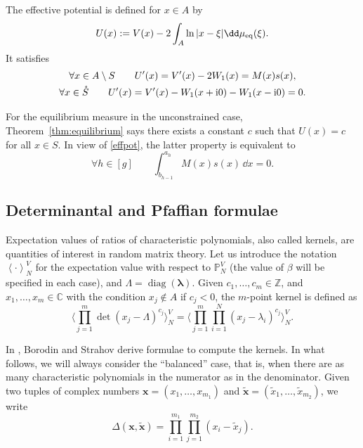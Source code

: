 \documentclass[pdftex]{sigma}
\numberwithin{equation}{section}
\newcommand{\mean}[1]{\left\langle{#1}\right\rangle}
\begin{document}
\begin{Definition}
The effective potential is defined for $x \in A$ by
\[
U(x) := V(x) - 2 \int_{A} \ln|x - \xi|\dd \mu_{{\rm eq}}(\xi).
\]
 It satisfies
\begin{gather}
\forall x \in A \setminus S  \qquad U'(x) = V'(x) - 2W_1(x) = M(x)s(x), \nonumber\\
\forall x \in \mathring{S}  \qquad U'(x) = V'(x) - W_1(x + {\rm i}0) - W_1(x - {\rm i}0) = 0.\label{effpot}
\end{gather}
\end{Definition}
\begin{Remark}%
\label{Rem:vanishint} For the equilibrium measure in the unconstrained case, Theorem~\ref{thm:equilibrium} says there exists a constant $c$ such that $U(x) = c$ for all $x \in S$. In view of \eqref{effpot}, the latter property is equivalent to
\begin{equation*}
\forall h \in [g]\qquad \int_{b_{h - 1}}^{a_h} M(x)s(x)\,\dd x = 0.
\end{equation*}
\end{Remark}

\subsection{Determinantal and Pfaffian
 formulae}%

Expectation values of ratios of
characteristic polynomials, also called kernels, are quantities of interest in random matrix theory. Let us introduce the notation
 $\mean{\cdot}^{V}_{N}$ for the expectation value with respect to $\mathbb{P}_{N}^V$ (the value of $\beta$ will be specified in each case), and $\Lambda = \operatorname{diag}(\bm{\lambda})$. Given $c_1,\ldots,c_m \in \mathbb{Z}$, and $x_1,\ldots,x_m \in \mathbb{C}$ with the condition $x_j \notin A$ if $c_j < 0$, the $m$-point kernel is defined as
\[
 \Biggl\langle \prod_{j=1}^{m} \det (x_{j} - \Lambda)^{c_j}\Biggr\rangle_{N}^{V} = \Biggl\langle \prod_{j=1}^{m} \prod_{i = 1}^{N} (x_{j} - \lambda_i)^{c_j}\Biggr\rangle_{N}^{V}.
\]

In \cite{borodin_averages}, Borodin and Strahov derive formulae
to compute the kernels. In what follows, we will always consider the ``balanced'' case, that
is, when there are as many characteristic polynomials in the numerator
as in the denominator. Given two tuples of complex numbers $\bm{x} = (x_{1}, \ldots, x_{m_1})$ and
$\bm{\tilde{x}} = (\tilde{x}_{1}, \ldots, \tilde{x}_{m_2})$, we write
\begin{equation*}
 \Delta(\bm{x},\bm{\tilde{x}}) = \prod_{i=1}^{m_1}\prod_{j=1}^{m_2} (x_{i} - \tilde{x}_{j}).
\end{equation*}
\end{document}
